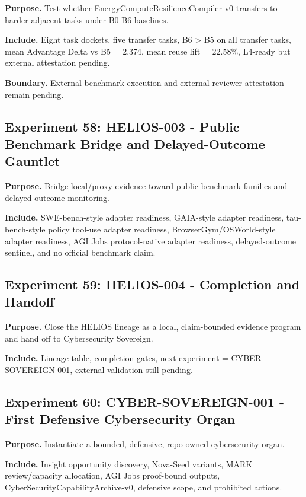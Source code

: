 \textbf{Purpose.} Test whether EnergyComputeResilienceCompiler-v0
transfers to harder adjacent tasks under B0-B6 baselines.

\textbf{Include.} Eight task dockets, five transfer tasks, B6
\textgreater{} B5 on all transfer tasks, mean Advantage Delta vs B5 =
2.374, mean reuse lift = 22.58\%, L4-ready but external attestation
pending.

\textbf{Boundary.} External benchmark execution and external reviewer
attestation remain pending.

\subsection{Experiment 58: HELIOS-003 - Public Benchmark Bridge and
Delayed-Outcome
Gauntlet}\label{experiment-58-helios-003---public-benchmark-bridge-and-delayed-outcome-gauntlet}

\textbf{Purpose.} Bridge local/proxy evidence toward public benchmark
families and delayed-outcome monitoring.

\textbf{Include.} SWE-bench-style adapter readiness, GAIA-style adapter
readiness, tau-bench-style policy tool-use adapter readiness,
BrowserGym/OSWorld-style adapter readiness, AGI Jobs protocol-native
adapter readiness, delayed-outcome sentinel, and no official benchmark
claim.

\subsection{Experiment 59: HELIOS-004 - Completion and
Handoff}\label{experiment-59-helios-004---completion-and-handoff}

\textbf{Purpose.} Close the HELIOS lineage as a local, claim-bounded
evidence program and hand off to Cybersecurity Sovereign.

\textbf{Include.} Lineage table, completion gates, next experiment =
CYBER-SOVEREIGN-001, external validation still pending.

\subsection{Experiment 60: CYBER-SOVEREIGN-001 - First Defensive
Cybersecurity
Organ}\label{experiment-60-cyber-sovereign-001---first-defensive-cybersecurity-organ}

\textbf{Purpose.} Instantiate a bounded, defensive, repo-owned
cybersecurity organ.

\textbf{Include.} Insight opportunity discovery, Nova-Seed variants,
MARK review/capacity allocation, AGI Jobs proof-bound outputs,
CyberSecurityCapabilityArchive-v0, defensive scope, and prohibited
actions.

